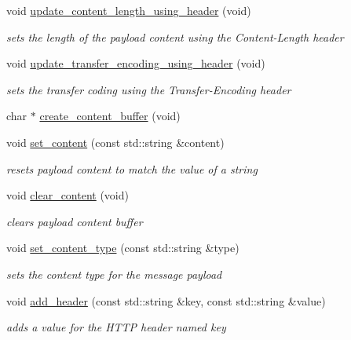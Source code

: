 \begin{DoxyCompactItemize}
\item 
void \hyperlink{classpion_1_1http_1_1message_a6a7a6a5114da843c033283a6c1db48aa}{update\-\_\-content\-\_\-length\-\_\-using\-\_\-header} (void)
\begin{DoxyCompactList}\small\item\em sets the length of the payload content using the Content-\/\-Length header \end{DoxyCompactList}\item 
void \hyperlink{classpion_1_1http_1_1message_a8118770f69c9a479f3f5dcbc58d6d644}{update\-\_\-transfer\-\_\-encoding\-\_\-using\-\_\-header} (void)
\begin{DoxyCompactList}\small\item\em sets the transfer coding using the Transfer-\/\-Encoding header \end{DoxyCompactList}\item 
char $\ast$ \hyperlink{classpion_1_1http_1_1message_a468f42e5bc2866d9c93138e3a4cec31b}{create\-\_\-content\-\_\-buffer} (void)
\item 
void \hyperlink{classpion_1_1http_1_1message_a3600676865fc813897e0ed45b58e5600}{set\-\_\-content} (const std\-::string \&content)
\begin{DoxyCompactList}\small\item\em resets payload content to match the value of a string \end{DoxyCompactList}\item 
void \hyperlink{classpion_1_1http_1_1message_a33567717927344a33bc8332ad3a391a6}{clear\-\_\-content} (void)
\begin{DoxyCompactList}\small\item\em clears payload content buffer \end{DoxyCompactList}\item 
void \hyperlink{classpion_1_1http_1_1message_add4f889bb2d22e163556c2fd5fd993a8}{set\-\_\-content\-\_\-type} (const std\-::string \&type)
\begin{DoxyCompactList}\small\item\em sets the content type for the message payload \end{DoxyCompactList}\item 
void \hyperlink{classpion_1_1http_1_1message_a115c9657c4933f034dcf2f4ce7bd55f0}{add\-\_\-header} (const std\-::string \&key, const std\-::string \&value)
\begin{DoxyCompactList}\small\item\em adds a value for the H\-T\-T\-P header named key \end{DoxyCompactList}\item 

\end{DoxyCompactItemize}
